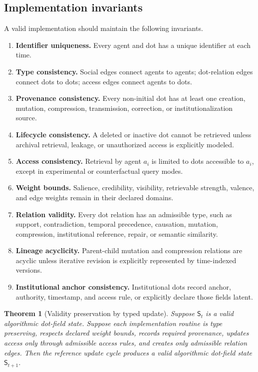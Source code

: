 \documentclass[11pt]{article}
\newtheorem{theorem}{Theorem}
\theoremstyle{remark}
\begin{document}
\subsection{Implementation invariants}\label{implementation-invariants}

A valid implementation should maintain the following invariants.

\begin{enumerate}[label=(I\arabic*),leftmargin=1.3cm]
\item \textbf{Identifier uniqueness.} Every agent and dot has a unique
identifier at each time.
\item \textbf{Type consistency.} Social edges connect agents to agents;
dot-relation edges connect dots to dots; access edges connect agents to
dots.
\item \textbf{Provenance consistency.} Every non-initial dot has at least
one creation, mutation, compression, transmission, correction, or
institutionalization source.
\item \textbf{Lifecycle consistency.} A deleted or inactive dot cannot be
retrieved unless archival retrieval, leakage, or unauthorized access is
explicitly modeled.
\item \textbf{Access consistency.} Retrieval by agent $a_i$ is limited to
dots accessible to $a_i$, except in experimental or counterfactual query
modes.
\item \textbf{Weight bounds.} Salience, credibility, visibility,
retrievable strength, valence, and edge weights remain in their declared
domains.
\item \textbf{Relation validity.} Every dot relation has an admissible type,
such as support, contradiction, temporal precedence, causation, mutation,
compression, institutional reference, repair, or semantic similarity.
\item \textbf{Lineage acyclicity.} Parent-child mutation and compression
relations are acyclic unless iterative revision is explicitly represented
by time-indexed versions.
\item \textbf{Institutional anchor consistency.} Institutional dots record
anchor, authority, timestamp, and access rule, or explicitly declare those
fields latent.
\end{enumerate}

\begin{theorem}[Validity preservation by typed update]\label{thm:validity-preservation-typed-update}
Suppose $\mathsf S_t$ is a valid algorithmic dot-field state. Suppose
each implementation routine is type preserving, respects declared weight
bounds, records required provenance, updates access only through
admissible access rules, and creates only admissible relation edges. Then
the reference update cycle produces a valid algorithmic dot-field state
$\mathsf S_{t+1}$.
\end{theorem}
\end{document}
